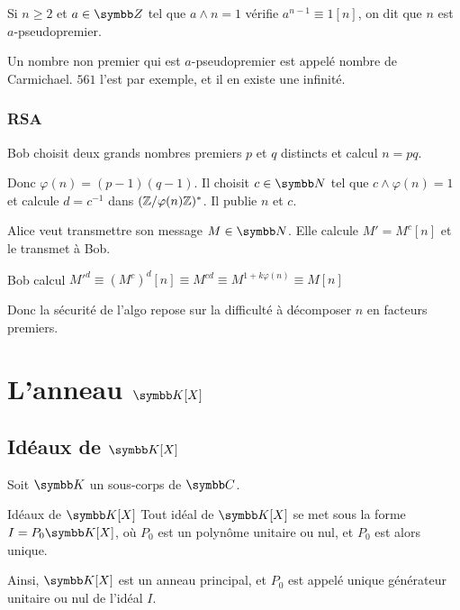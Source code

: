 Si $n \geqslant 2$ et $a \in \Z$ tel que $a \wedge n = 1$ vérifie $a^{n -1} \equiv 1 [n]$,
on dit que $n$ est $a$-pseudopremier.

Un nombre non premier qui est $a$-pseudopremier est appelé nombre de Carmichael. 
$561$ l'est par exemple, et il en existe une infinité. 

\subsubsection{RSA }

Bob choisit deux grands nombres premiers $p$ et $q$ distincts et calcul $n = pq$. 

Donc $\varphi(n) = (p- 1)(q-1)$. Il choisit $c \in \N$ tel que $c \wedge \varphi(n) = 1$ et 
calcule $d = c^{-1}$ dans $(\mathbb{Z}/\varphi(n)\mathbb{Z})^*$. Il publie $n$ et $c$. 

Alice veut transmettre son message $M \in \N$. Elle calcule $M' = M^c [n]$ et le transmet à Bob.

Bob calcul $M'^d \equiv (M^c)^d [n] \equiv M^{cd} \equiv M^{1 + k \varphi(n)} \equiv M[n]$

Donc la sécurité de l'algo repose sur la difficulté à décomposer $n$ en facteurs premiers. 


\section{L'anneau \texorpdfstring{$\K [X]$}{K[X]}}
\subsection{Idéaux de \texorpdfstring{$\K [X]$}{K[X]}}

Soit $\K$ un sous-corps de $\C$.

\begin{theoreme}{Idéaux de $\K[X]$}{}
    Tout idéal de $\K[X]$ se met sous la forme $I = P_0 \K[X]$, où $P_0$ est un polynôme
    unitaire ou nul, et $P_0$ est alors unique.

    Ainsi, $\K[X]$ est un anneau principal, et $P_0$ est appelé unique générateur unitaire 
    ou nul de l'idéal $I$.
\end{theoreme}


